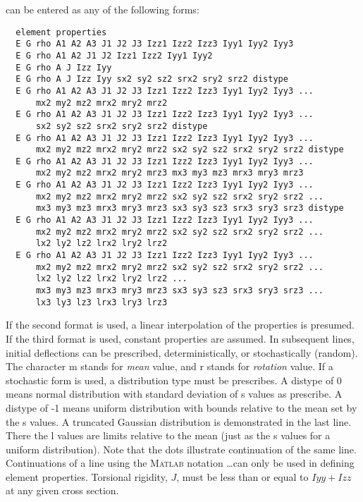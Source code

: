 \documentclass[12pt]{article}
\newcommand*{\command}[1]{\textsf{#1}}
\begin{document}
can be entered as any of the following forms:
\begin{lstlisting}
  element properties
  E G rho A1 A2 A3 J1 J2 J3 Izz1 Izz2 Izz3 Iyy1 Iyy2 Iyy3
  E G rho A1 A2 J1 J2 Izz1 Izz2 Iyy1 Iyy2
  E G rho A J Izz Iyy
  E G rho A J Izz Iyy sx2 sy2 sz2 srx2 sry2 srz2 distype
  E G rho A1 A2 A3 J1 J2 J3 Izz1 Izz2 Izz3 Iyy1 Iyy2 Iyy3 ...
      mx2 my2 mz2 mrx2 mry2 mrz2
  E G rho A1 A2 A3 J1 J2 J3 Izz1 Izz2 Izz3 Iyy1 Iyy2 Iyy3 ...
      sx2 sy2 sz2 srx2 sry2 srz2 distype
  E G rho A1 A2 A3 J1 J2 J3 Izz1 Izz2 Izz3 Iyy1 Iyy2 Iyy3 ...
      mx2 my2 mz2 mrx2 mry2 mrz2 sx2 sy2 sz2 srx2 sry2 srz2 distype
  E G rho A1 A2 A3 J1 J2 J3 Izz1 Izz2 Izz3 Iyy1 Iyy2 Iyy3 ...
      mx2 my2 mz2 mrx2 mry2 mrz3 mx3 my3 mz3 mrx3 mry3 mrz3
  E G rho A1 A2 A3 J1 J2 J3 Izz1 Izz2 Izz3 Iyy1 Iyy2 Iyy3 ...
      mx2 my2 mz2 mrx2 mry2 mrz2 sx2 sy2 sz2 srx2 sry2 srz2 ...
      mx3 my3 mz3 mrx3 mry3 mrz3 sx3 sy3 sz3 srx3 sry3 srz3 distype
  E G rho A1 A2 A3 J1 J2 J3 Izz1 Izz2 Izz3 Iyy1 Iyy2 Iyy3 ...
      mx2 my2 mz2 mrx2 mry2 mrz2 sx2 sy2 sz2 srx2 sry2 srz2 ...
      lx2 ly2 lz2 lrx2 lry2 lrz2
  E G rho A1 A2 A3 J1 J2 J3 Izz1 Izz2 Izz3 Iyy1 Iyy2 Iyy3 ...
      mx2 my2 mz2 mrx2 mry2 mrz2 sx2 sy2 sz2 srx2 sry2 srz2 ...
      lx2 ly2 lz2 lrx2 lry2 lrz2 ...
      mx3 my3 mz3 mrx3 mry3 mrz3 sx3 sy3 sz3 srx3 sry3 srz3 ...
      lx3 ly3 lz3 lrx3 lry3 lrz3
\end{lstlisting}
If the second format is used, a linear interpolation of the properties is presumed. If the third format is used, constant properties are assumed. In subsequent lines, initial deflections can be prescribed, deterministically, or stochastically (random). The character \command{m} stands for \emph{mean} value, and \command{r} stands for \emph{rotation} value. If a stochastic form is used, a distribution type must be prescribes. A \command{distype} of \command{0} means normal distribution with standard deviation of \command{s} values as prescribe. A \command{distype} of \command{-1} means uniform distribution with bounds relative to the mean set by the \command{s} values. A truncated Gaussian distribution is demonstrated in the last line. There the \command{l} values are limits relative to the mean (just as the \command{s} values for a uniform distribution). Note that the dots illustrate continuation of the same line. Continuations of a line using the M\textsc{atlab} notation \ldots can only be used in defining element properties. Torsional rigidity, $J$, must be less than or equal to $Iyy+Izz$ at any given cross section.
\end{document}

